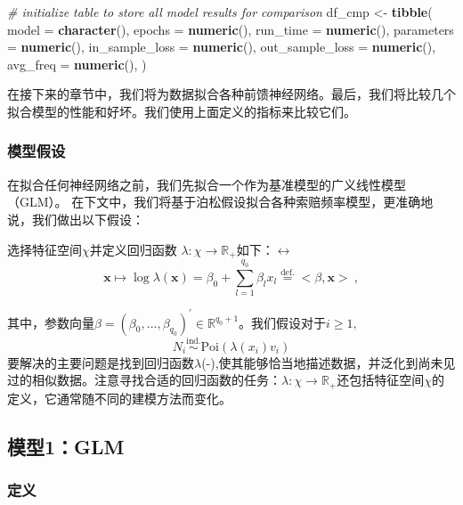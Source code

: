 \documentclass[
]{article}
\newenvironment{Shaded}{\begin{snugshade}}{\end{snugshade}}
\newcommand{\AttributeTok}[1]{\textcolor[rgb]{0.13,0.29,0.53}{#1}}
\newcommand{\CommentTok}[1]{\textcolor[rgb]{0.56,0.35,0.01}{\textit{#1}}}
\newcommand{\FunctionTok}[1]{\textcolor[rgb]{0.13,0.29,0.53}{\textbf{#1}}}
\newcommand{\NormalTok}[1]{#1}
\newcommand{\OtherTok}[1]{\textcolor[rgb]{0.56,0.35,0.01}{#1}}
\begin{document}
\begin{Shaded}
\begin{Highlighting}[]
\CommentTok{\# initialize table to store all model results for comparison}
\NormalTok{df\_cmp }\OtherTok{\textless{}{-}} \FunctionTok{tibble}\NormalTok{(}
 \AttributeTok{model =} \FunctionTok{character}\NormalTok{(),}
 \AttributeTok{epochs =} \FunctionTok{numeric}\NormalTok{(),}
 \AttributeTok{run\_time =} \FunctionTok{numeric}\NormalTok{(),}
 \AttributeTok{parameters =} \FunctionTok{numeric}\NormalTok{(),}
 \AttributeTok{in\_sample\_loss =} \FunctionTok{numeric}\NormalTok{(),}
 \AttributeTok{out\_sample\_loss =} \FunctionTok{numeric}\NormalTok{(),}
 \AttributeTok{avg\_freq =} \FunctionTok{numeric}\NormalTok{(),}
\NormalTok{)}
\end{Highlighting}
\end{Shaded}

在接下来的章节中，我们将为数据拟合各种前馈神经网络。最后，我们将比较几个拟合模型的性能和好坏。我们使用上面定义的指标来比较它们。

\subsubsection{模型假设}\label{ux6a21ux578bux5047ux8bbe}

在拟合任何神经网络之前，我们先拟合一个作为基准模型的广义线性模型（GLM）。
在下文中，我们将基于泊松假设拟合各种索赔频率模型，更准确地说，我们做出以下假设：

选择特征空间\(\chi\)并定义回归函数
\(\lambda:\chi\to\mathbb{R}_+\)如下：\(\leftrightarrow\)
\[\mathbf{x}\mapsto\log\lambda(\mathbf{x})=\beta_0+\sum_{l=1}^{q_0}\beta_lx_l\stackrel{\mathrm{def.}}{=}<\beta,\mathbf{x}>\:,\]

其中，参数向量\(\beta=(\beta_0,\ldots,\beta_{q_0})^{\prime}\in\mathbb{R}^{q_0+1}\)。我们假设对于\(i\geq1,\)
\[N_i\stackrel{\mathrm{ind.}}{\sim}\mathrm{Poi}(\lambda(x_i)v_i)\]
要解决的主要问题是找到回归函数\(\lambda\)(-),使其能够恰当地描述数据，并泛化到尚未见过的相似数据。注意寻找合适的回归函数的任务：\(\lambda:\chi\to\mathbb{R}_+\)还包括特征空间\(\chi\)的定义，它通常随不同的建模方法而变化。

\subsection{模型1：GLM}\label{ux6a21ux578b1glm}

\subsubsection{定义}\label{ux5b9aux4e49}
\end{document}
